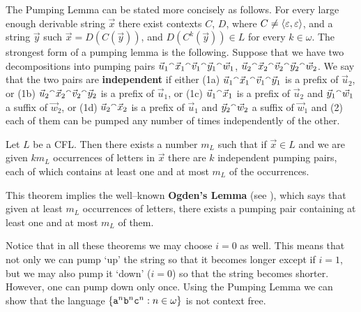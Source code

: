 The Pumping Lemma can be stated more concisely as follows.
For every large enough derivable string $\vec{x}$ there exist 
contexts $C$, $D$, where $C \neq \langle \varepsilon, \varepsilon\rangle$,
and a string $\vec{y}$ such $\vec{x} = D(C(\vec{y}))$,
and $D(C^k(\vec{y})) \in L$ for every $k \in \omega$.
The strongest form of a pumping lemma is the following.  
Suppose that we have two decompositions into pumping pairs 
$\vec{u}_1{^{\smallfrown}} \vec{x}_1 {^{\smallfrown}} \vec{v}_1{^{\smallfrown}}\vec{y}_1{^{\smallfrown}}\vec{w}_1$, 
$\vec{u}_2{^{\smallfrown}} \vec{x}_2 {^{\smallfrown}} \vec{v}_2{^{\smallfrown}}\vec{y}_2{^{\smallfrown}}\vec{w}_2$. 
We say that the two pairs are \textbf{independent} 
if either (1a) $\vec{u}_1{^{\smallfrown}} \vec{x}_1{^{\smallfrown}}\vec{v}_1{^{\smallfrown}}\vec{y}_1$ 
is a prefix of $\vec{u}_2$, or
(1b) $\vec{u}_2{^{\smallfrown}} \vec{x}_2{^{\smallfrown}}\vec{v}_2{^{\smallfrown}}\vec{y}_2$ is a 
prefix of $\vec{u}_1$, or
(1c) $\vec{u}_1{^{\smallfrown}}\vec{x}_1$ is a prefix of $\vec{u}_2$ and 
$\vec{y}_1{^{\smallfrown}}\vec{w}_1$ a suffix of $\vec{w}_2$, or
(1d) $\vec{u}_2{^{\smallfrown}}\vec{x}_2$ is a prefix of $\vec{u}_1$ and 
$\vec{y}_2{^{\smallfrown}}\vec{w}_2$ a suffix of $\vec{w}_1$ and 
(2) each of them can be pumped any number of times independently 
of the other. 
\nocite{manasterrameretal:ogden}
\begin{thm}
\label{thm:multipump}
Let $L$ be a CFL. Then there exists a number 
$m_{L}$ such that if $\vec{x} \in L$ and we are given $k m_L$ 
occurrences of letters in $\vec{x}$ there are $k$ independent 
pumping pairs, each of which contains at least one and at most 
$m_L$ of the occurrences. 
\end{thm}
This theorem implies the well--known \textbf{Ogden's Lemma} (see 
\cite{ogden:helpful}), which says that given at least $m_L$ 
occurrences of letters, there exists a pumping pair containing 
at least one and at most $m_L$ of them.

Notice that in all these theorems we may choose $i = 0$ as well. This 
means that not only we can pump `up' the string so that it becomes longer
except if $i = 1$, but we may also pump it `down' ($i = 0$)
so that the string becomes shorter. However, one can pump down 
only once. Using the Pumping Lemma we can show that the language
$\{\mbox{\tt a}^n \mbox{\tt b}^n \mbox{\tt c}^n : n \in \omega\}$
is not context free.

